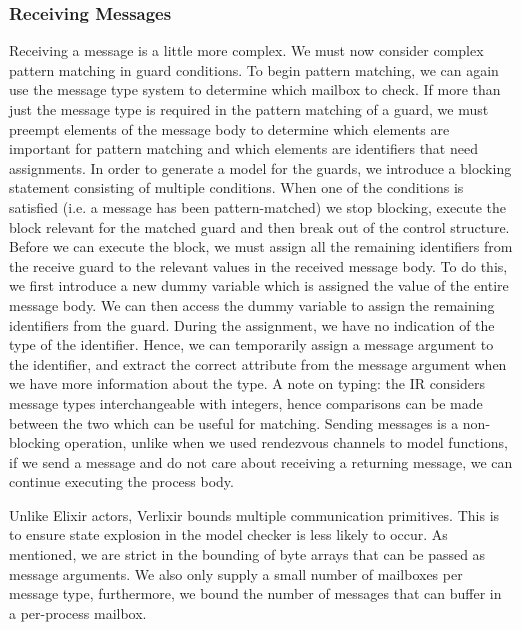 \subsubsection{Receiving Messages}
Receiving a message is a little more complex. We must now consider complex pattern matching in guard conditions. To begin pattern matching, we can again use the message type system to determine which mailbox to check. If more than just the message type is required in the pattern matching of a guard, we must preempt elements of the message body to determine which elements are important for pattern matching and which elements are identifiers that need assignments. In order to generate a model for the guards, we introduce a blocking statement consisting of multiple conditions. When one of the conditions is satisfied (i.e. a message has been pattern-matched) we stop blocking, execute the block relevant for the matched guard and then break out of the control structure. Before we can execute the block, we must assign all the remaining identifiers from the receive guard to the relevant values in the received message body. To do this, we first introduce a new dummy variable which is assigned the value of the entire message body. We can then access the dummy variable to assign the remaining identifiers from the guard. During the assignment, we have no indication of the type of the identifier. Hence, we can temporarily assign a message argument to the identifier, and extract the correct attribute from the message argument when we have more information about the type. A note on typing: the IR considers message types interchangeable with integers, hence comparisons can be made between the two which can be useful for matching. Sending messages is a non-blocking operation, unlike when we used rendezvous channels to model functions, if we send a message and do not care about receiving a returning message, we can continue executing the process body.
\par
Unlike Elixir actors, Verlixir bounds multiple communication primitives. This is to ensure state explosion in the model checker is less likely to occur. As mentioned, we are strict in the bounding of byte arrays that can be passed as message arguments. We also only supply a small number of mailboxes per message type, furthermore, we bound the number of messages that can buffer in a per-process mailbox.
